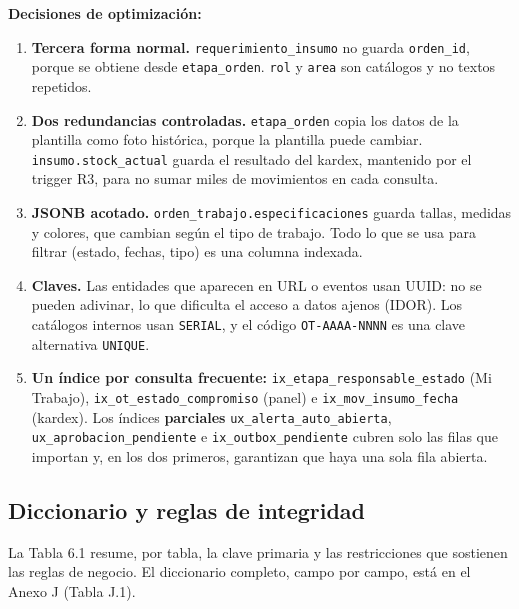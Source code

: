 \documentclass[11pt,a4paper]{article}
\begin{document}
\textbf{Decisiones de optimización:}

\begin{enumerate}
\item \textbf{Tercera forma normal.} \texttt{requerimiento\_\allowbreak{}insumo} no guarda \texttt{orden\_\allowbreak{}id}, porque se obtiene desde \texttt{etapa\_\allowbreak{}orden}. \texttt{rol} y \texttt{area} son catálogos y no textos repetidos.
\item \textbf{Dos redundancias controladas.} \texttt{etapa\_\allowbreak{}orden} copia los datos de la plantilla como foto histórica, porque la plantilla puede cambiar. \texttt{insumo.\allowbreak{}stock\_\allowbreak{}actual} guarda el resultado del kardex, mantenido por el trigger R3, para no sumar miles de movimientos en cada consulta.
\item \textbf{JSONB acotado.} \texttt{orden\_\allowbreak{}trabajo.\allowbreak{}especificaciones} guarda tallas, medidas y colores, que cambian según el tipo de trabajo. Todo lo que se usa para filtrar (estado, fechas, tipo) es una columna indexada.
\item \textbf{Claves.} Las entidades que aparecen en URL o eventos usan UUID: no se pueden adivinar, lo que dificulta el acceso a datos ajenos (IDOR). Los catálogos internos usan \texttt{SERIAL}, y el código \texttt{OT-{}\allowbreak{}AAAA-{}\allowbreak{}NNNN} es una clave alternativa \texttt{UNIQUE}.
\item \textbf{Un índice por consulta frecuente:} \texttt{ix\_\allowbreak{}etapa\_\allowbreak{}responsable\_\allowbreak{}estado} (Mi Trabajo), \texttt{ix\_\allowbreak{}ot\_\allowbreak{}estado\_\allowbreak{}compromiso} (panel) e \texttt{ix\_\allowbreak{}mov\_\allowbreak{}insumo\_\allowbreak{}fecha} (kardex). Los índices \textbf{parciales} \texttt{ux\_\allowbreak{}alerta\_\allowbreak{}auto\_\allowbreak{}abierta}, \texttt{ux\_\allowbreak{}aprobacion\_\allowbreak{}pendiente} e \texttt{ix\_\allowbreak{}outbox\_\allowbreak{}pendiente} cubren solo las filas que importan y, en los dos primeros, garantizan que haya una sola fila abierta.
\end{enumerate}

\subsection{Diccionario y reglas de integridad}

La Tabla 6.1 resume, por tabla, la clave primaria y las restricciones que sostienen las reglas de negocio. El diccionario completo, campo por campo, está en el Anexo J (Tabla J.1).
\end{document}
